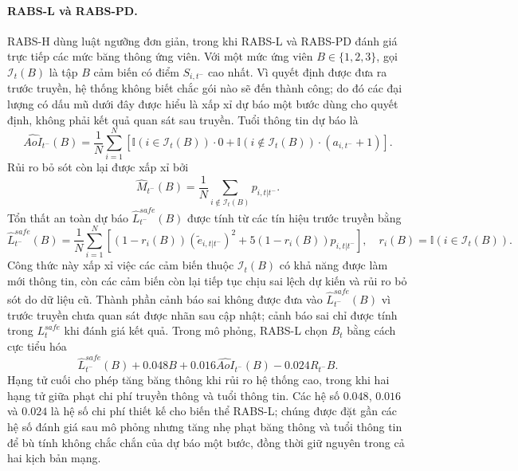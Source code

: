\documentclass[10pt]{article}
\begin{document}
\paragraph{RABS-L và RABS-PD.}
RABS-H dùng luật ngưỡng đơn giản, trong khi RABS-L và RABS-PD đánh giá trực tiếp các mức băng thông ứng viên. Với một mức ứng viên $B\in\{1,2,3\}$, gọi $\mathcal{I}_t(B)$ là tập $B$ cảm biến có điểm $S_{i,t^-}$ cao nhất. Vì quyết định được đưa ra trước truyền, hệ thống không biết chắc gói nào sẽ đến thành công; do đó các đại lượng có dấu mũ dưới đây được hiểu là xấp xỉ dự báo một bước dùng cho quyết định, không phải kết quả quan sát sau truyền. Tuổi thông tin dự báo là
\begin{equation}
\widehat{AoI}_{t^-}(B)=\frac{1}{N}\sum_{i=1}^{N}\left[\mathbb{I}(i\in\mathcal{I}_t(B))\cdot 0+\mathbb{I}(i\notin\mathcal{I}_t(B))\cdot(a_{i,t^-}+1)\right].
\end{equation}
Rủi ro bỏ sót còn lại được xấp xỉ bởi
\begin{equation}
\widehat M_{t^-}(B)=\frac{1}{N}\sum_{i\notin\mathcal{I}_t(B)}p_{i,t|t^-}.
\end{equation}
Tổn thất an toàn dự báo $\widehat L^{safe}_{t^-}(B)$ được tính từ các tín hiệu trước truyền bằng
\begin{equation}
\widehat L^{safe}_{t^-}(B)=\frac{1}{N}\sum_{i=1}^{N}\left[(1-r_i(B))(\tilde e_{i,t|t^-})^2+5(1-r_i(B))p_{i,t|t^-}\right],\quad
r_i(B)=\mathbb{I}(i\in\mathcal{I}_t(B)).
\end{equation}
Công thức này xấp xỉ việc các cảm biến thuộc $\mathcal{I}_t(B)$ có khả năng được làm mới thông tin, còn các cảm biến còn lại tiếp tục chịu sai lệch dự kiến và rủi ro bỏ sót do dữ liệu cũ. Thành phần cảnh báo sai không được đưa vào $\widehat L^{safe}_{t^-}(B)$ vì trước truyền chưa quan sát được nhãn sau cập nhật; cảnh báo sai chỉ được tính trong $L^{safe}_t$ khi đánh giá kết quả. Trong mô phỏng, RABS-L chọn $B_t$ bằng cách cực tiểu hóa
\begin{equation}
\widehat L^{safe}_{t^-}(B)+0.048B+0.016\widehat{AoI}_{t^-}(B)-0.024R_{t^-}B.
\end{equation}
Hạng tử cuối cho phép tăng băng thông khi rủi ro hệ thống cao, trong khi hai hạng tử giữa phạt chi phí truyền thông và tuổi thông tin. Các hệ số $0.048$, $0.016$ và $0.024$ là hệ số chi phí thiết kế cho biến thể RABS-L; chúng được đặt gần các hệ số đánh giá sau mô phỏng nhưng tăng nhẹ phạt băng thông và tuổi thông tin để bù tính không chắc chắn của dự báo một bước, đồng thời giữ nguyên trong cả hai kịch bản mạng.
\end{document}
